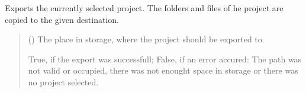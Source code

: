 \documentclass[letterpaper,10pt,english]{sphinxmanual}
\begin{document}
\begin{fulllineitems}
\begin{fulllineitems}
\begin{quote}
\begin{description}
\sphinxAtStartPar
{}

\end{description}\end{quote}

\end{fulllineitems}


\begin{fulllineitems}
\label{\detokenize{apidoc/src.osm_configurator.control:src.osm_configurator.control.control_interface.IControl.export_project}}
\pysigstartsignatures
{}
\pysigstopsignatures
\sphinxAtStartPar
Exports the currently selected project.
The folders and files of he project are copied to the given destination.
\begin{quote}\begin{description}
\sphinxAtStartPar
{} () \textendash{} The place in storage, where the project should be exported to.

\sphinxAtStartPar
True, if the export was successfull; False, if an error accured: The path was not valid or occupied, there was not enought space in storage or there was no project selected.

\sphinxAtStartPar
{}

\end{description}\end{quote}

\end{fulllineitems}



\end{fulllineitems}
\end{document}
